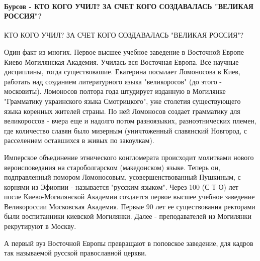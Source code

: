  
 
 
 
 
\paragraph{Бурсов - КТО КОГО УЧИЛ? ЗА СЧЕТ КОГО СОЗДАВАЛАСЬ "ВЕЛИКАЯ РОССИЯ"?}
\label{sec:14_07_2021.fb.krjukova_svetlana.1.statja_putina_mnenie.cmt.bursov_kto_kogo_uchil}

\begin{itemize}
 
КТО КОГО УЧИЛ? ЗА СЧЕТ КОГО СОЗДАВАЛАСЬ "ВЕЛИКАЯ РОССИЯ"? 

Один факт из многих. Первое высшее учебное заведение в Восточной Европе
Киево-Могилянская Академия. Училась вся Восточная Европа. Все научные
дисциплины, тогда существовашие. Екатерина посылает Ломоносова в Киев, работать
над созданием литературного языка "великоросов" (до этого - московиты).
Ломоносов полтора года штудирует изданную в Могилянке "Грамматику украинского
языка Смотрицкого", уже столетия существующего языка коренных жителей страны.
По ней Ломоносов создает грамматику для великороссов - вчера еще и надолго
потом разноязыких, разноэтнических племен, где количество славян было мизерным
(уничтоженный славянский Новгород, с расселением оставшихся в живых по
закоулкам). 

Имперское объединение этнического конгломерата происходит молитвами нового
вероисповедания на староболгарском (македонском) языке. Теперь он,
подправленный помором Ломоносовым, усовершенствованный Пушкиным, с корнями из
Эфиопии - называется "русским языком". Через 100 (С Т О) лет после
Киево-Могилянской Академии создается первое высшее учебное заведение
Великороссии Московская Академия. Первые 90 лет ее существования ректорами были
воспитанники киевской Могилянки. Далее - преподавателей из Могилянки
рекрутируют в Москву. 

А первый вуз Восточной Европы превращают в поповское заведение, для кадров так
называемой русской православной церкви. 


\end{itemize}
